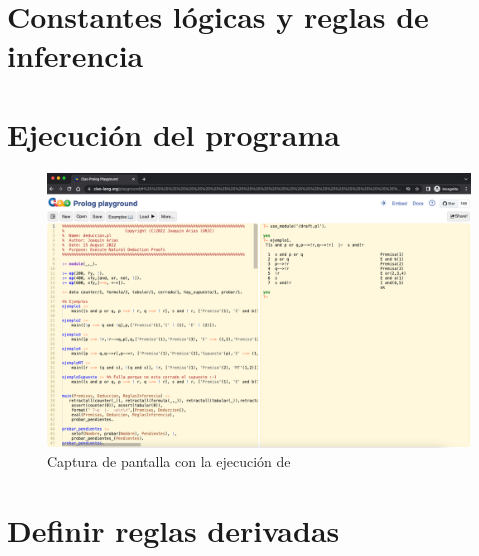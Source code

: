 \documentclass[12pt, a4paper]{urjc}
\begin{document}
\section{Constantes lógicas y reglas de inferencia}
\label{sec:operadores}


\section{Ejecución del programa}
\label{sec:deduccion}

\begin{figure}
  \centering
    \includegraphics[scale=.3]{captura}  
  \caption{Captura de pantalla con la ejecución de }
  \label{fig:ded}
\end{figure}



\section{Definir reglas derivadas}
\label{sec:derivadas}


\appendix
\printbibliography
\end{document}
